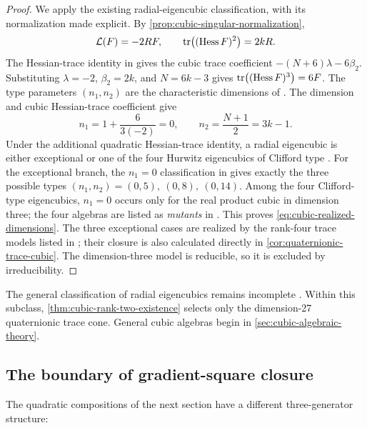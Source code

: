 \begin{proof}
We apply the existing radial-eigencubic classification, with its
normalization made explicit. By
\cref{prop:cubic-singular-normalization},
\[
 \mathcal L(F)=-2RF,\qquad
 \operatorname{tr}\bigl((\operatorname{Hess} F)^2\bigr)=2kR.
\]
The Hessian-trace identity in
\cite[Lemma~5.1(i)]{TkachevClassification10} gives the cubic trace
coefficient \(-(N+6)\lambda-6\beta_2\). Substituting
\(\lambda=-2\), \(\beta_2=2k\), and \(N=6k-3\) gives \(\operatorname{tr}\bigl((\operatorname{Hess} F)^3\bigr)=6F\).
The type parameters \((n_1,n_2)\) are the characteristic dimensions
of \cite[Definition~6.7.1, Proposition~6.11.2, and
Corollary~6.11.1]{NadirashviliTkachevVladut14}.
The dimension and cubic Hessian-trace coefficient give
\[
 n_1=1+\frac{6}{3(-2)}=0,
 \qquad n_2=\frac{N+1}{2}=3k-1.
\]
Under the additional quadratic Hessian-trace identity, a radial
eigencubic is either exceptional or one of the four Hurwitz eigencubics
of Clifford type \cite[Corollary~6.11.2 and Section~6.11.5]{NadirashviliTkachevVladut14}.
For the exceptional branch, the \(n_1=0\) classification in
\cite[Proposition~6.1]{TkachevClassification10} gives exactly the
three possible types \((n_1,n_2)=(0,5),\ (0,8),\ (0,14)\).
Among the four Clifford-type eigencubics, \(n_1=0\) occurs only for
the real product cubic in dimension three; the four algebras are listed
as \emph{mutants} in \cite[Section~6.11.5]{NadirashviliTkachevVladut14}.
This proves \eqref{eq:cubic-realized-dimensions}. The three
exceptional cases are realized by the rank-four trace models listed in
\cite[Section~6.11.6(iii)]{NadirashviliTkachevVladut14};
their closure is also calculated directly in
\cref{cor:quaternionic-trace-cubic}. The dimension-three model is
reducible, so it is excluded by irreducibility.
\end{proof}

The general classification of radial eigencubics remains incomplete
\cite[Section~2.2]{FoxTkachev24}. Within this subclass,
\cref{thm:cubic-rank-two-existence} selects only the dimension-27
quaternionic trace cone. General cubic algebras begin in
\cref{sec:cubic-algebraic-theory}.





\subsection{The boundary of gradient-square closure}

The quadratic compositions of the next section have a different
three-generator structure:

